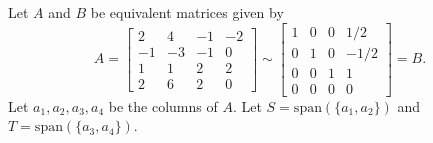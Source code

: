 \documentclass[addpoints]{exam}
\newcommand{\spn}{\mathrm{span}}
\newcommand{\nll}{\mathrm{null}}
\begin{document}
\begin{questions}
    \question
    Let $A$ and $B$ be equivalent matrices given by
    \[
        A =
        \begin{bmatrix}
            2 & 4 & -1 & -2 \\
            -1 & -3 & -1 & 0 \\
            1 & 1 & 2 & 2 \\
            2 & 6 & 2 & 0
        \end{bmatrix}
        \sim
        \begin{bmatrix}
            1 & 0 & 0 & 1/2 \\
            0 & 1 & 0 & -1/2 \\
            0 & 0 & 1 & 1 \\
            0 & 0 & 0 & 0
        \end{bmatrix}
        = B.
    \]
    Let $a_1,a_2,a_3,a_4$ be the columns of $A$. Let $S=\spn(\{a_1,a_2\})$ and
    $T=\spn(\{a_3,a_4\})$.

\end{questions}
\end{document}

